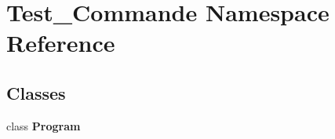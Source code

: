 \hypertarget{namespaceTest__Commande}{}\section{Test\+\_\+\+Commande Namespace Reference}
\label{namespaceTest__Commande}
\subsection*{Classes}
\begin{DoxyCompactItemize}
\item 
class {\bfseries Program}
\end{DoxyCompactItemize}
